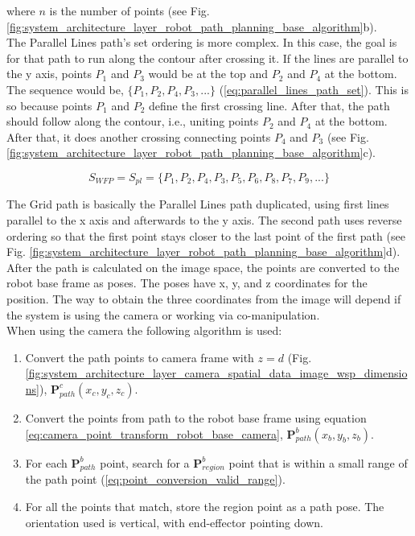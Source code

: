 where $n$ is the number of points (see Fig. \ref{fig:system_architecture_layer_robot_path_planning_base_algorithm}b).\\

The Parallel Lines path's set ordering is more complex. In this case, the goal is for that path to run along the contour after crossing it. If the lines are parallel to the y axis, points $P_1$ and $P_3$ would be at the top and $P_2$ and $P_4$ at the bottom. The sequence would be, $\{P_1, P_2, P_4, P_3, ...\}$ (\ref{eq:parallel_lines_path_set}). This is so because points $P_1$ and $P_2$ define the first crossing line. After that, the path should follow along the contour, i.e., uniting points $P_2$ and $P_4$ at the bottom. After that, it does another crossing connecting points $P_4$ and $P_3$ (see Fig. \ref{fig:system_architecture_layer_robot_path_planning_base_algorithm}c).

\begin{equation}
\label{eq:parallel_lines_path_set}
    S_{WFP} = S_{pl} = \{ P_1, P_2, P_4, P_3, P_5, P_6, P_8, P_7, P_9, ... \}
\end{equation}

The Grid path is basically the Parallel Lines path duplicated, using first lines parallel to the x axis and afterwards to the y axis. The second path uses reverse ordering so that the first point stays closer to the last point of the first path (see Fig. \ref{fig:system_architecture_layer_robot_path_planning_base_algorithm}d).\\

After the path is calculated on the image space, the points are converted to the robot base frame as poses. The poses have x, y, and z coordinates for the position. The way to obtain the three coordinates from the image will depend if the system is using the camera or working via co-manipulation.\\

When using the camera the following algorithm is used:

\begin{enumerate}
    \item Convert the path points to camera frame with $z = d$ (Fig. \ref{fig:system_architecture_layer_camera_spatial_data_image_wsp_dimensions}), $\boldsymbol{P}^c_{path}(x_c, y_c, z_c)$.
    \item Convert the points from path to the robot base frame using equation \ref{eq:camera_point_transform_robot_base_camera}, $\boldsymbol{P}^b_{path}(x_b, y_b, z_b)$.
    \item For each $\boldsymbol{P}^b_{path}$ point, search for a $\boldsymbol{P}^b_{region}$ point that is within a small range of the path point (\ref{eq:point_conversion_valid_range}).
    \item For all the points that match, store the region point as a path pose. The orientation used is vertical, with end-effector pointing down.
\end{enumerate}

